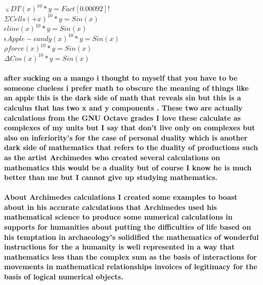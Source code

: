 $\varsigma{DT(x) ^ 10 * y = Fact[0.00092]!}$
\textbf{\\}
$\Sigma{Cells(+x) ^ 10 * y = Sin(x)}$
\textbf{\\}
$\epsilon{line(x) ^ 10 * y = Sin(x)}$
\textbf{\\}
$\epsilon{Apple-candy(x) ^ 10 * y = Sin(x)}$
\textbf{\\}
$\rho{force(x) ^ 10 * y = Sin(x)}$
\textbf{\\}
$\Delta{Cos(x) ^ 10 * y = Sin(x)}$
\textbf{\\\\}
\textbf{after sucking on a mango i thought to myself that you have to be someone clueless i prefer math to obscure the meaning of things like an apple this is the dark side of math that reveals sin but this is a calculus that has two x and y components . These two are actually calculations from the GNU Octave grades I love these calculate as complexes of my units but I say that don't live only on complexes but also on inferiority's for the case of personal duality which is another dark side of mathematics that refers to the duality of productions such as the artist Archimedes who created several calculations on mathematics this would be a duality but of course I know he is much better than me but I cannot give up studying mathematics.}
\textbf{\\\\}
\textbf{About Archimedes calculations I created some examples to boast about in his accurate calculations that Archimedes used his mathematical science to produce some numerical calculations in supports for humanities about putting the difficulties of life based on his temptation in archaeology's solidified the mathematics of wonderful instructions for the a humanity is well represented in a way that mathematics less than the complex sum as the basis of interactions for movements in mathematical relationships invoices of legitimacy for the basis of logical numerical objects.}

